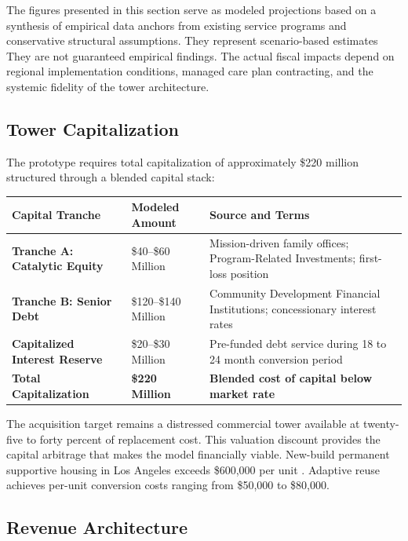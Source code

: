 \documentclass[12pt, letterpaper]{article}
\begin{document}
The figures presented in this section serve as modeled projections based on a synthesis of empirical data anchors from existing service programs and conservative structural assumptions. They represent scenario-based estimates They are not guaranteed empirical findings. The actual fiscal impacts depend on regional implementation conditions, managed care plan contracting, and the systemic fidelity of the tower architecture.

\subsection{Tower Capitalization}

The prototype requires total capitalization of approximately \$220 million structured through a blended capital stack:

\begin{table}[H]
\centering
\begin{tabularx}{\textwidth}{@{}lXX@{}}
\toprule
\textbf{Capital Tranche} & \textbf{Modeled Amount} & \textbf{Source and Terms} \\
\midrule
\textbf{Tranche A: Catalytic Equity} & \$40--\$60 Million & Mission-driven family offices; Program-Related Investments; first-loss position \\
\textbf{Tranche B: Senior Debt} & \$120--\$140 Million & Community Development Financial Institutions; concessionary interest rates \\
\textbf{Capitalized Interest Reserve} & \$20--\$30 Million & Pre-funded debt service during 18 to 24 month conversion period \\
\textbf{Total Capitalization} & \textbf{\$220 Million} & \textbf{Blended cost of capital below market rate} \\
\bottomrule
\end{tabularx}
\end{table}

The acquisition target remains a distressed commercial tower available at twenty-five to forty percent of replacement cost. This valuation discount provides the capital arbitrage that makes the model financially viable. New-build permanent supportive housing in Los Angeles exceeds \$600,000 per unit \citep{pacific_research_2024}. Adaptive reuse achieves per-unit conversion costs ranging from \$50,000 to \$80,000.

\subsection{Revenue Architecture}
\end{document}
